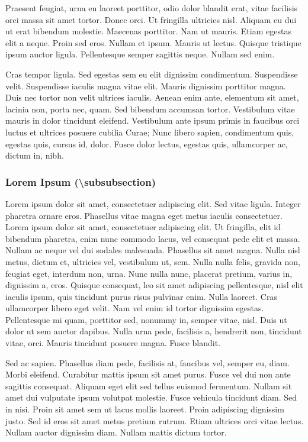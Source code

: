 \documentclass[article,colorback,accentcolor=tud4c]{tudreport}
\begin{document}
    Praesent feugiat, urna eu laoreet porttitor, odio dolor blandit erat, vitae facilisis orci massa sit amet tortor. Donec orci. Ut fringilla ultricies nisl. Aliquam eu dui ut erat bibendum molestie. Maecenas porttitor. Nam ut mauris. Etiam egestas elit a neque. Proin sed eros. Nullam et ipsum. Mauris ut lectus. Quisque tristique ipsum auctor ligula. Pellentesque semper sagittis neque. Nullam sed enim.

    Cras tempor ligula. Sed egestas sem eu elit dignissim condimentum. Suspendisse velit. Suspendisse iaculis magna vitae elit. Mauris dignissim porttitor magna. Duis nec tortor non velit ultrices iaculis. Aenean enim ante, elementum sit amet, lacinia non, porta nec, quam. Sed bibendum accumsan tortor. Vestibulum vitae mauris in dolor tincidunt eleifend. Vestibulum ante ipsum primis in faucibus orci luctus et ultrices posuere cubilia Curae; Nunc libero sapien, condimentum quis, egestas quis, cursus id, dolor. Fusce dolor lectus, egestas quis, ullamcorper ac, dictum in, nibh.

  \subsubsection{Lorem Ipsum (\textbackslash subsubsection)}

    Lorem ipsum dolor sit amet, consectetuer adipiscing elit. Sed vitae ligula. Integer pharetra ornare eros. Phasellus vitae magna eget metus iaculis consectetuer. Lorem ipsum dolor sit amet, consectetuer adipiscing elit. Ut fringilla, elit id bibendum pharetra, enim nunc commodo lacus, vel consequat pede elit et massa. Nullam ac neque vel dui sodales malesuada. Phasellus sit amet magna. Nulla nisl metus, dictum et, ultricies vel, vestibulum ut, sem. Nulla nulla felis, gravida non, feugiat eget, interdum non, urna. Nunc nulla nunc, placerat pretium, varius in, dignissim a, eros. Quisque consequat, leo sit amet adipiscing pellentesque, nisl elit iaculis ipsum, quis tincidunt purus risus pulvinar enim. Nulla laoreet. Cras ullamcorper libero eget velit. Nam vel enim id tortor dignissim egestas. Pellentesque mi quam, porttitor sed, nonummy in, semper vitae, nisl. Duis ut dolor ut sem auctor dapibus. Nulla urna pede, facilisis a, hendrerit non, tincidunt vitae, orci. Mauris tincidunt posuere magna. Fusce blandit.

    Sed ac sapien. Phasellus diam pede, facilisis at, faucibus vel, semper eu, diam. Morbi eleifend. Curabitur mattis ipsum sit amet purus. Fusce vel dui non ante sagittis consequat. Aliquam eget elit sed tellus euismod fermentum. Nullam sit amet dui vulputate ipsum volutpat molestie. Fusce vehicula tincidunt diam. Sed in nisi. Proin sit amet sem ut lacus mollis laoreet. Proin adipiscing dignissim justo. Sed id eros sit amet metus pretium rutrum. Etiam ultrices orci vitae lectus. Nullam auctor dignissim diam. Nullam mattis dictum tortor.
\end{document}
